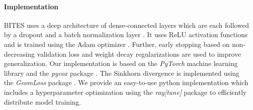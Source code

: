 \documentclass{article}
\begin{document}
	\paragraph{Implementation}
	BITES uses a deep architecture of dense-connected layers which are each followed by a dropout \cite{Srivastava.2014} and a batch normalization layer \cite{Ioffe.2015}. It uses ReLU activation functions \cite{Nair.2010} and is trained using the Adam optimizer \cite{Kingma.2014}. Further, early stopping based on non-decreasing validation loss and weight decay regularizations \cite{Krogh.1992} are used to improve generalization.
	Our implementation is based on the \textit{PyTorch} machine learning library \cite{Paszke.2019} and the \textit{pycox} package \cite{Kvamme.2019}. The Sinkhorn divergence is implemented using the \textit{GeomLoss} package \cite{Feydy.2018}. We provide an easy-to-use python implementation which includes a hyperparameter optimization using the \textit{ray[tune]} package \cite{Liaw.2018} to efficiently distribute model training.
	
\end{document}

